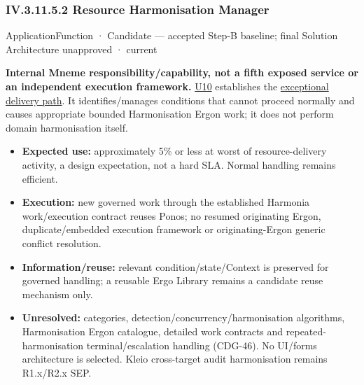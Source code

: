 \subsubsection*{IV.3.11.5.2 Resource Harmonisation Manager}
\label{navigation:IV.3.11.5.2}

\label{element:a6580e0b9f0f40c9a33d731d20110057}
{\small ApplicationFunction · Candidate — accepted Step-B baseline; final Solution Architecture unapproved · current}\par

\textbf{Internal Mneme responsibility/capability, not a fifth exposed service or an
independent execution framework.} \href{\detokenize{../../../../../../../../../docs/markdown/05-information-systems-architecture/sources.md#u10}}{U10} establishes the
\hyperref[element:a6580e0b9f0f40c9a33d731d20110057]{exceptional delivery path}.
It identifies/manages conditions that cannot proceed normally and causes appropriate
bounded Harmonisation Ergon work; it does not perform domain harmonisation itself.



\begin{itemize}


\item \textbf{Expected use:} approximately 5\% or less at worst of resource-delivery activity,
  a design expectation, not a hard SLA. Normal handling remains efficient.

\item \textbf{Execution:} new governed work through the established Harmonia work/execution
  contract reuses Ponos; no resumed originating Ergon, duplicate/embedded execution
  framework or originating-Ergon generic conflict resolution.

\item \textbf{Information/reuse:} relevant condition/state/Context is preserved for governed
  handling; a reusable Ergo Library remains a candidate reuse mechanism only.

\item \textbf{Unresolved:} categories, detection/concurrency/harmonisation algorithms,
  Harmonisation Ergon catalogue, detailed work contracts and repeated-harmonisation
  terminal/escalation handling (CDG-46). No UI/forms architecture is selected.
  Kleio cross-target audit harmonisation remains R1.x/R2.x SEP.

\end{itemize}

